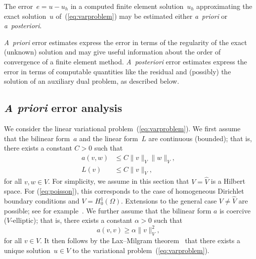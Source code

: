 The error~$e = u - u_h$ in a computed finite element solution~$u_h$
approximating the exact solution~$u$ of~(\ref{eq:varproblem}) may be
estimated either \emph{a~priori} or \emph{a~posteriori}.

\emph{A~priori} error estimates express the error in terms of the
regularity of the exact (unknown) solution and may give useful
information about the order of convergence of a finite element
method. \emph{A~posteriori} error estimates express the error in terms
of computable quantities like the residual and (possibly) the solution
of an auxiliary dual problem, as described below.

\subsection{\emph{A priori} error analysis}

We consider the linear variational problem~(\ref{eq:varproblem}). We
first assume that the bilinear form~$a$ and the linear form~$L$ are
continuous (bounded); that is, there exists a constant $C > 0$ such
that
\begin{equation} \label{eq:continuity}
  \begin{split}
    a(v, w) &\leqslant C \|v\|_V \|w\|_V,
    \\
    L(v) &\leqslant C \|v\|_V,
  \end{split}
\end{equation}
for all $v, w \in V$. For simplicity, we assume in this section that
$V = \hat{V}$ is a Hilbert space. For (\ref{eq:poisson}), this
corresponds to the case of homogeneous Dirichlet boundary conditions
and $V = H^1_0(\Omega)$. Extensions to the general case $V \neq
\hat{V}$ are possible; see for example~\citet{OdenDemkowicz1996}. We
further assume that the bilinear form $a$ is coercive ($V$-elliptic);
that is, there exists a constant $\alpha > 0$ such that
\begin{equation} \label{eq:coercivity}
  a(v, v) \geqslant \alpha \|v\|_V^2,
\end{equation}
for all $v \in V$. It then follows by the Lax--Milgram
theorem~\citep{LaxMilgram1954} that there exists a unique solution~$u
\in V$ to the variational problem~(\ref{eq:varproblem}).

